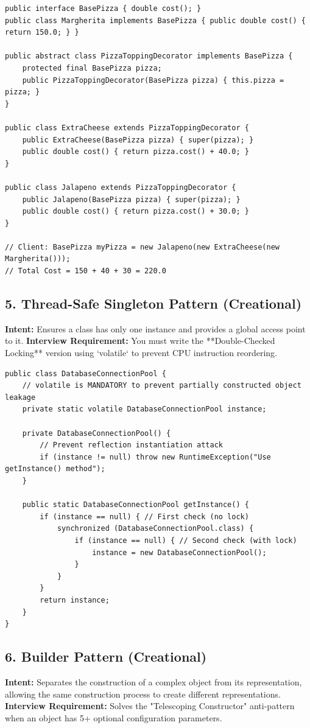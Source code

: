 \documentclass[10pt,journal,compsoc,onecolumn]{IEEEtran}
\begin{document}
\begin{verbatim}
public interface BasePizza { double cost(); }
public class Margherita implements BasePizza { public double cost() { return 150.0; } }

public abstract class PizzaToppingDecorator implements BasePizza {
    protected final BasePizza pizza;
    public PizzaToppingDecorator(BasePizza pizza) { this.pizza = pizza; }
}

public class ExtraCheese extends PizzaToppingDecorator {
    public ExtraCheese(BasePizza pizza) { super(pizza); }
    public double cost() { return pizza.cost() + 40.0; }
}

public class Jalapeno extends PizzaToppingDecorator {
    public Jalapeno(BasePizza pizza) { super(pizza); }
    public double cost() { return pizza.cost() + 30.0; }
}

// Client: BasePizza myPizza = new Jalapeno(new ExtraCheese(new Margherita()));
// Total Cost = 150 + 40 + 30 = 220.0
\end{verbatim}

\subsection{5. Thread-Safe Singleton Pattern (Creational)}
\textbf{Intent:} Ensures a class has only one instance and provides a global access point to it.
\textbf{Interview Requirement:} You must write the **Double-Checked Locking** version using `volatile` to prevent CPU instruction reordering.

\begin{verbatim}
public class DatabaseConnectionPool {
    // volatile is MANDATORY to prevent partially constructed object leakage
    private static volatile DatabaseConnectionPool instance;

    private DatabaseConnectionPool() {
        // Prevent reflection instantiation attack
        if (instance != null) throw new RuntimeException("Use getInstance() method");
    }

    public static DatabaseConnectionPool getInstance() {
        if (instance == null) { // First check (no lock)
            synchronized (DatabaseConnectionPool.class) {
                if (instance == null) { // Second check (with lock)
                    instance = new DatabaseConnectionPool();
                }
            }
        }
        return instance;
    }
}
\end{verbatim}

\subsection{6. Builder Pattern (Creational)}
\textbf{Intent:} Separates the construction of a complex object from its representation, allowing the same construction process to create different representations.
\textbf{Interview Requirement:} Solves the "Telescoping Constructor" anti-pattern when an object has 5+ optional configuration parameters.
\end{document}
